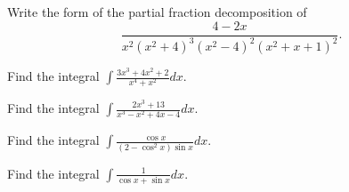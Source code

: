 \documentclass[
  course = {{MATH102 Calculus II}},
  quartile = {{2}},
  assignment = {{Section 7.4}},%
  topic = {{Integration of Rational Functions By Partial Fractions}},
  firstexercise = 1,
  term = 203
]{../class/aga-homework}
\begin{document}
\newpage

\problem Write the form of the partial fraction decomposition of \[\displaystyle \frac{4-2x}{x^2(x^2+4)^3(x^2-4)^2(x^2+x+1)^2}.  \]


\newpage


\problem Find the integral $\displaystyle \int \frac{3x^3+4x^2+2}{x^4+x^2} dx $.


\newpage

\problem Find the integral $\displaystyle \int \frac{2x^3+13}{x^3-x^2+4x-4} dx $.


\newpage

\problem Find the integral $\displaystyle \int \frac{\cos x}{(2-\cos^2 x)\sin x} dx $.


\newpage

\problem Find the integral $\displaystyle \int \frac{1}{\cos x+\sin x} dx $.

\afterpage{\null\newpage}

\afterpage{\null\newpage}

\afterpage{\null\newpage}
\end{document}

